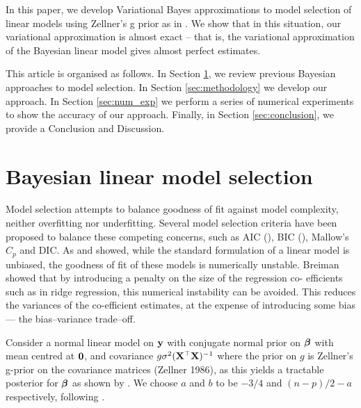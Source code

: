 \documentclass{amsart}[12pt]
\begin{document}

In this paper, we develop Variational Bayes approximations to model selection of linear models using Zellner's
g prior as in \cite{Liang2008}. We show that in this situation, our variational approximation is almost exact
-- that is, the variational approximation of the Bayesian linear model gives almost perfect estimates.


This article is organised as follows. In Section \ref{sec:model_selection}, we review previous Bayesian
approaches to model selection. In Section \ref{sec:methodology} we develop our approach. In Section
\ref{sec:num_exp} we perform a series of numerical experiments to show the accuracy of our approach. Finally,
in Section \ref{sec:conclusion}, we provide a Conclusion and Discussion.

\section{Bayesian linear model selection}
\label{sec:model_selection}

Model selection attempts to balance goodness of fit against model complexity, neither overfitting nor
underfitting. Several model selection criteria have been proposed to balance these competing concerns, such as
AIC (\cite{DeLeeuw1992}), BIC (\cite{Schwarz1978}), Mallow's $C_p$ and DIC. As \cite{Breiman1996} and
\cite{Efron2013} showed, while  the standard formulation of a linear model is unbiased, the goodness of fit of
these models is numerically  unstable. Breiman showed that by introducing a penalty on the size of the
regression co- efficients such as  in ridge regression, this numerical instability can be avoided. This reduces
the variances of the co-efficient estimates, at the expense of introducing some bias --- the bias--variance
trade--off.

Consider a normal linear model on ${\bf y}$ with conjugate normal prior on ${\boldsymbol \beta}$ with mean centred at ${\bf 0}$,
and covariance $g \sigma^2 ({\bf X}^\top {\bf X})^{-1}$ where the prior on $g$ is Zellner's g-prior on the covariance
matrices (Zellner 1986), as this yields a tractable posterior for ${\boldsymbol \beta}$ as shown by \cite{Liang2008}. We
choose $a$  and $b$ to be $-3/4$ and $(n - p)/2 - a$ respectively, following \cite{Maruyama2011}.
\end{document}
